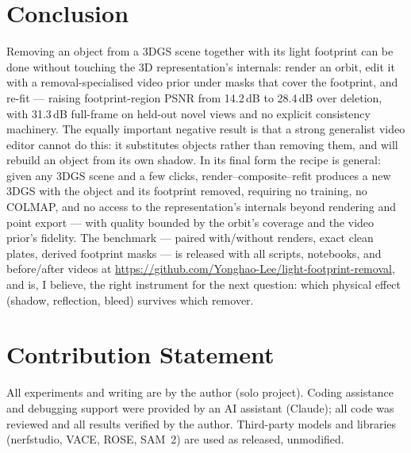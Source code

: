 \documentclass[11pt]{article}
\begin{document}
\section{Conclusion}
Removing an object from a 3DGS scene together with its light footprint can be done without touching the 3D representation's internals: render an orbit, edit it with a removal-specialised video prior under masks that cover the footprint, and re-fit --- raising footprint-region PSNR from 14.2\,dB to 28.4\,dB over deletion, with 31.3\,dB full-frame on held-out novel views and no explicit consistency machinery. The equally important negative result is that a strong generalist video editor cannot do this: it substitutes objects rather than removing them, and will rebuild an object from its own shadow. In its final form the recipe is general: given any 3DGS scene and a few clicks, render--composite--refit produces a new 3DGS with the object and its footprint removed, requiring no training, no COLMAP, and no access to the representation's internals beyond rendering and point export --- with quality bounded by the orbit's coverage and the video prior's fidelity. The benchmark --- paired with/without renders, exact clean plates, derived footprint masks --- is released with all scripts, notebooks, and before/after videos at \url{https://github.com/Yonghao-Lee/light-footprint-removal}, and is, I believe, the right instrument for the next question: which physical effect (shadow, reflection, bleed) survives which remover.

\section*{Contribution Statement}
All experiments and writing are by the author (solo project). Coding assistance and debugging support were provided by an AI assistant (Claude); all code was reviewed and all results verified by the author. Third-party models and libraries (nerfstudio, VACE, ROSE, SAM~2) are used as released, unmodified.
\end{document}

